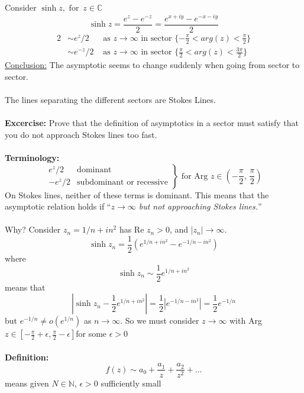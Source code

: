 \documentclass{article}
\newcommand{\definition}{\textbf{Definition:}}
\begin{document}
\\
\\
Consider $\sinh z, \mbox{ for }\, z \in \mathbb{C} $
\[ \sinh z = \frac{e^z- e^{-z}}{2} = \frac{e^{x+iy} - e^{-x-iy}}{2} \]
\begin{alignat*}{2}
& \sim  e^z/2 &\mbox{ as } z \to \infty \mbox{ in sector } \{ -\frac{\pi}{2}
< arg(z) < \frac{\pi}{2} \} \\
& \sim  e^{-z}/2 &\mbox{ as } z \to \infty \mbox{ in sector } \{ \frac{\pi}{2}
< arg(z) < \frac{3\pi}{2} \} 
\end{alignat*}
\underline{Conclusion:} The asymptotic seems to change suddenly when going from
sector to sector. %
\\
\\
The lines separating the different sectors are Stokes Lines.
\\
\\
\textbf{Excercise:} Prove that the definition of asymptotics in a sector must satisfy
that you do not approach Stokes lines too fast.
\\
\\
\textbf{Terminology:} 
\[ \left. \begin{array}{rc}
e^{z}/2 & \mbox{dominant} \\
-e^{z}/2 & \mbox{subdominant or recessive} \end{array} \right\} \mbox{ for Arg }
z \in ( - \frac{\pi}{2} , \, \frac{\pi}{2} )\]
On Stokes lines, neither of these terms is dominant. This means that the asymptotic 
relation holds if ``\emph{$z \to \infty$ but not approaching Stokes lines.}''
\\
\\
Why? Consider $z_n = 1/n + in^2$ has Re $z_n >0$, and $|z_n| \to \infty$.
\[ \sinh z_n = \frac{1}{2} \left( e^{1/n + in^2} - e^{-1/n -in^2} \right)\]
where
\[ \sinh z_n \sim \frac{1}{2} e^{1/n + in^2} \]
means that 
\[ \left| \sinh z_n - \frac{1}{2} e^{1/n + in^2} \right| = \frac{1}{2} \left| e^{-1/n -in^2}
\right| = \frac{1}{2} e^{-1/n}\]
but $e^{-1/n} \neq o \left( e^{1/n} \right)$ as $n\to \infty$.
So we must consider $z \to \infty$ with Arg $z \in [ -\frac{\pi}{2} + \epsilon, 
\frac{\pi}{2} - \epsilon ] $for some $\epsilon >0$
\\
\\
\definition\ 
\begin{equation}\tag{$z\to \infty, \, Arg \, z \in (\alpha, \beta) $}
f(z) \sim a_0 + \frac{a_1}{z} + \frac{a_2}{z^2} + \dots
\end{equation}
means given $N \in \mathbb{N}$, $\epsilon >0$ sufficiently small
\end{document}
